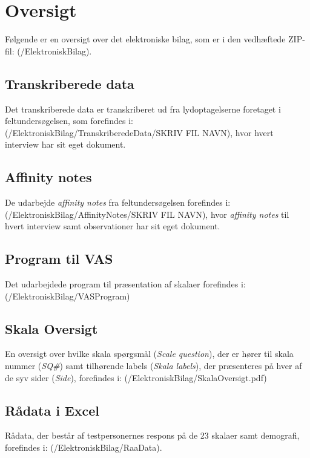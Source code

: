 \chapter{Oversigt}
\label{ElektroniskBilagOversigt}
%
Følgende er en oversigt over det elektroniske bilag, som er i den vedhæftede ZIP-fil: (/ElektroniskBilag).

\section{Transkriberede data}
\label{ElektroniskBilagTranskriberede}
%
Det transkriberede data er transkriberet ud fra lydoptagelserne foretaget i feltundersøgelsen, som forefindes i: (/ElektroniskBilag/TranskriberedeData/SKRIV FIL NAVN), hvor hvert interview har sit eget dokument. 

\section{Affinity notes}
\label{ElektroniskBilagAffinityNotes}
%
De udarbejde \textit{affinity notes} fra feltundersøgelsen forefindes i: (/ElektroniskBilag/AffinityNotes/SKRIV FIL NAVN), hvor \textit{affinity notes} til hvert interview samt observationer har sit eget dokument. 

\section{Program til VAS}
\label{ElektroniskBilagProgram}
%
Det udarbejdede program til præsentation af skalaer forefindes i: (/ElektroniskBilag/VASProgram)

\section{Skala Oversigt}
\label{ElektroniskBilagSkalaOversigt}
%
En oversigt over hvilke skala spørgsmål (\textit{Scale question}), der er hører til skala nummer (\textit{SQ\#}) samt tilhørende labels (\textit{Skala labels}), der præsenteres på hver af de syv sider (\textit{Side}), forefindes i: (/ElektroniskBilag/SkalaOversigt.pdf)



\section{Rådata i Excel}
\label{ElektroniskBilagExcel}
%
Rådata, der består af testpersonernes respons på de 23 skalaer samt demografi, forefindes i: (/ElektroniskBilag/RaaData).

